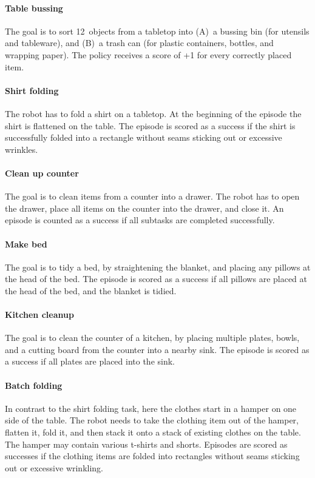 \paragraph{Table bussing} The goal is to sort 12~objects from a tabletop into (A)~a bussing bin (for utensils and tableware), and (B)~a trash can (for plastic containers, bottles, and wrapping paper). The policy receives a score of +1 for every correctly placed item.

\paragraph{Shirt folding} The robot has to fold a shirt on a tabletop. At the beginning of the episode the shirt is flattened on the table. The episode is scored as a success if the shirt is successfully folded into a rectangle without seams sticking out or excessive wrinkles.

\paragraph{Clean up counter} The goal is to clean items from a counter into a drawer. The robot has to open the drawer, place all items on the counter into the drawer, and close it. An episode is counted as a success if all subtasks are completed successfully.

\paragraph{Make bed} The goal is to tidy a bed, by straightening the blanket, and placing any pillows at the head of the bed. The episode is scored as a success if all pillows are placed at the head of the bed, and the blanket is tidied.

\paragraph{Kitchen cleanup} The goal is to clean the counter of a kitchen, by placing multiple plates, bowls, and a cutting board from the counter into a nearby sink. The episode is scored as a success if all plates are placed into the sink.

\paragraph{Batch folding} In contrast to the shirt folding task, here the clothes start in a hamper on one side of the table. The robot needs to take the clothing item out of the hamper, flatten it, fold it, and then stack it onto a stack of existing clothes on the table. The hamper may contain various t-shirts and shorts. Episodes are scored as successes if the clothing items are folded into rectangles without seams sticking out or excessive wrinkling.

